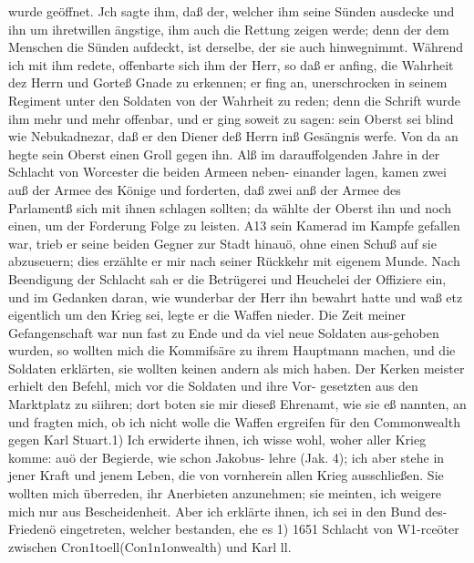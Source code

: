 wurde geöffnet. Jch sagte ihm, daß der, welcher ihm seine Sünden
ausdecke und ihn um ihretwillen ängstige, ihm auch die Rettung
zeigen werde; denn der dem Menschen die Sünden aufdeckt, ist
derselbe, der sie auch hinwegnimmt. Während ich mit ihm redete,
offenbarte sich ihm der Herr, so daß er anfing, die Wahrheit dez
Herrn und Gorteß Gnade zu erkennen; er fing an, unerschrocken
in seinem Regiment unter den Soldaten von der Wahrheit zu
reden; denn die Schrift wurde ihm mehr und mehr offenbar, und
er ging soweit zu sagen: sein Oberst sei blind wie Nebukadnezar,
daß er den Diener deß Herrn inß Gesängnis werfe. Von da an
hegte sein Oberst einen Groll gegen ihn. Alß im darauffolgenden
Jahre in der Schlacht von Worcester die beiden Armeen neben-
einander lagen, kamen zwei auß der Armee des Könige und
forderten, daß zwei anß der Armee des Parlamentß sich mit ihnen
schlagen sollten; da wählte der Oberst ihn und noch einen, um
der Forderung Folge zu leisten. A13 sein Kamerad im Kampfe
gefallen war, trieb er seine beiden Gegner zur Stadt hinauö, ohne
einen Schuß auf sie abzuseuern; dies erzählte er mir nach seiner
Rückkehr mit eigenem Munde. Nach Beendigung der Schlacht
sah er die Betrügerei und Heuchelei der Offiziere ein, und im
Gedanken daran, wie wunderbar der Herr ihn bewahrt hatte und
waß etz eigentlich um den Krieg sei, legte er die Waffen nieder.
Die Zeit meiner Gefangenschaft war nun fast zu Ende und
da viel neue Soldaten aus-gehoben wurden, so wollten mich die
Kommifsäre zu ihrem Hauptmann machen, und die Soldaten
erklärten, sie wollten keinen andern als mich haben. Der Kerken
meister erhielt den Befehl, mich vor die Soldaten und ihre Vor-
gesetzten aus den Marktplatz zu siihren; dort boten sie mir dieseß
Ehrenamt, wie sie eß nannten, an und fragten mich, ob ich nicht
wolle die Waffen ergreifen für den Commonwealth gegen Karl
Stuart.1) Ich erwiderte ihnen, ich wisse wohl, woher aller
Krieg komme: auö der Begierde, wie schon Jakobus- lehre
(Jak. 4); ich aber stehe in jener Kraft und jenem Leben,
die von vornherein allen Krieg ausschließen. Sie wollten mich
überreden, ihr Anerbieten anzunehmen; sie meinten, ich weigere
mich nur aus Bescheidenheit. Aber ich erklärte ihnen, ich sei in
den Bund des- Friedenö eingetreten, welcher bestanden, ehe es
1) 1651 Schlacht von W1-rceöter zwischen Cron1toell(Con1n1onwealth) und
Karl ll.


